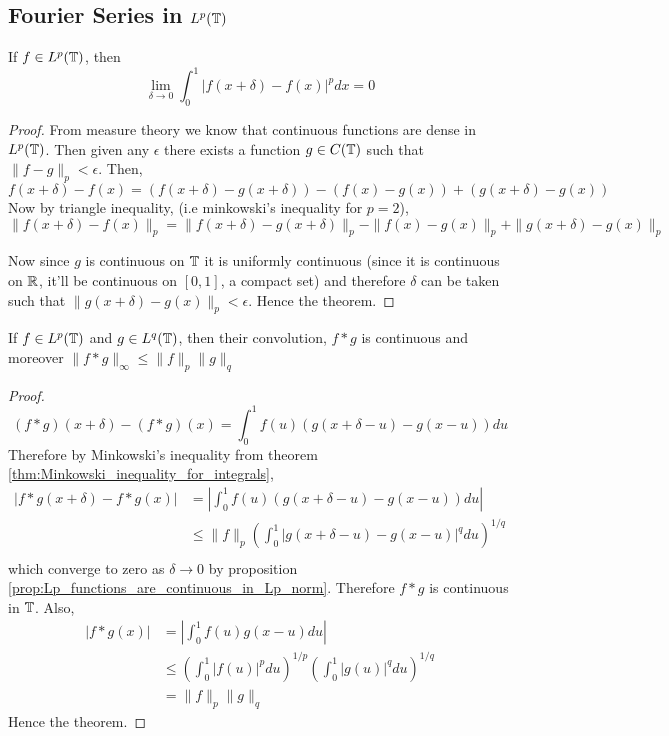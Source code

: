 \subsection{Fourier Series in $L^p(\mathbb T)$}
\begin{proposition}
  \label{prop:Lp_functions_are_continuous_in_Lp_norm}
  If $f \in L^p(\mathbb T)$, then
  \begin{displaymath}
   \lim_{\delta \to 0} \int_0^1 |f(x+\delta) - f(x)|^p dx = 0
  \end{displaymath}
\end{proposition}
\begin{proof}
  From measure theory we know that continuous functions are dense in $L^p(\mathbb T)$. Then given any $\epsilon$ there exists a function $g\in C(\mathbb T)$ such that $\|f-g\|_p < \epsilon$. Then,
  $$ f(x+\delta) - f(x) = (f(x+\delta) - g(x+\delta)) - (f(x) - g(x)) + ( g(x+\delta) - g(x))$$
  Now by triangle inequality, (i.e minkowski's inequality for $p = 2$), 
  $$ \|f(x+\delta) - f(x)\|_p = \|f(x+\delta) - g(x+\delta)\|_p - \|f(x) - g(x)\|_p + \|g(x+\delta) - g(x)\|_p$$

  Now since $g$ is continuous on $\mathbb T$ it is uniformly continuous (since it is continuous on $\mathbb R$, it'll be continuous on $[0,1]$, a compact set) and therefore $\delta$ can be taken such that $\|g(x+\delta) - g(x) \|_p < \epsilon$. Hence the theorem.
\end{proof}

\begin{proposition}
  \label{prop:convolution_of_Lp_functions}
  If $f \in L^p(\mathbb T)$ and $g \in L^q(\mathbb T)$, then their convolution, $f*g$ is continuous and moreover $\|f*g\|_{\infty} \le \|f\|_p \|g\|_q$
\end{proposition}
\begin{proof}
  $$(f*g)(x+\delta) - (f*g)(x) = \int_0^1 f(u)(g(x+\delta - u) - g(x-u)) du $$
  Therefore by Minkowski's inequality from theorem \ref{thm:Minkowski_inequality_for_integrals}, 
  \begin{align*}
    |f*g(x+\delta) - f*g(x)| &= \left| \int_0^1 f(u) (g(x + \delta -u)- g(x-u)) du \right| \\
          &\le \|f\|_p \left( \int_0^1|g(x+\delta - u) - g(x-u)|^q du \right)^{1/q} \\
  \end{align*}
  which converge to zero as $\delta \to 0$ by proposition \ref{prop:Lp_functions_are_continuous_in_Lp_norm}. Therefore $f*g$ is continuous in $\mathbb T$.
  Also, 
  \begin{align*}
    |f*g(x)| &= \left| \int_0^1 f(u)g(x-u) du \right| \\
            &\le \left(\int_0^1 |f(u)|^p du \right)^{1/p} \left(\int_0^1 |g(u)|^q du \right)^{1/q} \\
            &= \|f\|_p \|g\|_q
  \end{align*}
  Hence the theorem.
\end{proof}


